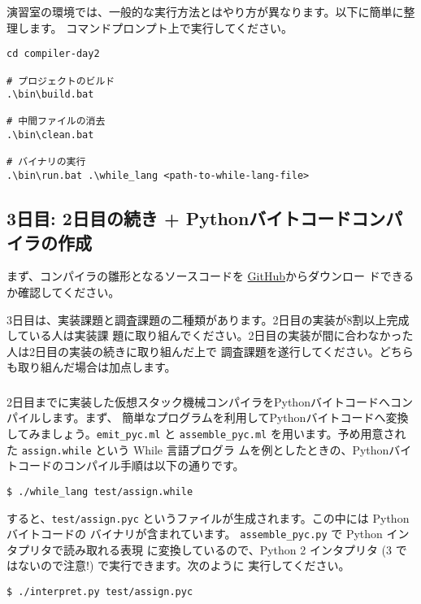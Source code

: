 \documentclass[a4paper,11pt]{jsarticle}
\begin{document}
演習室の環境では、一般的な実行方法とはやり方が異なります。以下に簡単に整理します。
コマンドプロンプト上で実行してください。

\begin{lstlisting}
cd compiler-day2

# プロジェクトのビルド
.\bin\build.bat

# 中間ファイルの消去
.\bin\clean.bat

# バイナリの実行
.\bin\run.bat .\while_lang <path-to-while-lang-file>
\end{lstlisting}

\subsection{3日目: 2日目の続き + Pythonバイトコードコンパイラの作成}

まず、コンパイラの雛形となるソースコードを
\href{https://github.com/tmu-compiler-info-sys-exp-I/compiler-day3}{GitHub}からダウンロー
ドできるか確認してください。

3日目は、実装課題と調査課題の二種類があります。2日目の実装が8割以上完成している人は実装課
題に取り組んでください。2日目の実装が間に合わなかった人は2日目の実装の続きに取り組んだ上で
調査課題を遂行してください。どちらも取り組んだ場合は加点します。

\subsubsection{}

2日目までに実装した仮想スタック機械コンパイラをPythonバイトコードへコンパイルします。まず、
簡単なプログラムを利用してPythonバイトコードへ変換してみましょう。\verb|emit_pyc.ml| と
\verb|assemble_pyc.ml| を用います。予め用意された \verb|assign.while| という While 言語プログラ
ムを例としたときの、Pythonバイトコードのコンパイル手順は以下の通りです。

\begin{lstlisting}
$ ./while_lang test/assign.while
\end{lstlisting}

すると、\verb|test/assign.pyc| というファイルが生成されます。この中には Pythonバイトコードの
バイナリが含まれています。 \verb|assemble_pyc.py| で Python インタプリタで読み取れる表現
に変換しているので、Python 2 インタプリタ (3 ではないので注意!) で実行できます。次のように
実行してください。

\begin{lstlisting}
$ ./interpret.py test/assign.pyc
\end{lstlisting}
\end{document}
